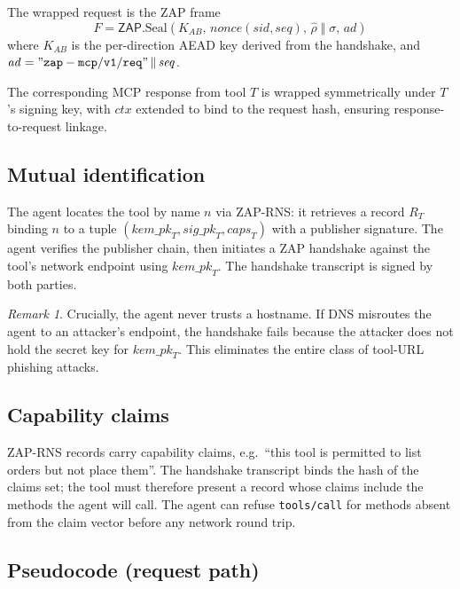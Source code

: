 \documentclass[11pt,a4paper]{article}
\theoremstyle{definition}
\theoremstyle{remark}
\newtheorem{remark}[theorem]{Remark}
\newcommand{\zap}{\textsf{ZAP}\xspace}
\newcommand{\mcp}{\textsf{MCP}\xspace}
\newcommand{\rns}{\textsf{ZAP-RNS}\xspace}
\begin{document}
The wrapped request is the \zap{} frame
\[
F = \zap.\mathrm{Seal}(K_{AB},\, \mathit{nonce}(\mathit{sid},\mathit{seq}),\,
\hat{\rho}\;\Vert\;\sigma,\, \mathit{ad})
\]
where $K_{AB}$ is the per-direction AEAD key derived from the handshake,
and $\mathit{ad} = \mathtt{"zap-mcp/v1/req"} \,\Vert\, \mathit{seq}$.

The corresponding \mcp{} response from tool $T$ is wrapped symmetrically
under $T$'s signing key, with $\mathit{ctx}$ extended to bind to the
request hash, ensuring response-to-request linkage.

\subsection{Mutual identification}

The agent locates the tool by name $n$ via \rns{}: it retrieves a record
$R_T$ binding $n$ to a tuple
$(\mathit{kem\_pk}_T, \mathit{sig\_pk}_T, \mathit{caps}_T)$ with a
publisher signature. The agent verifies the publisher chain, then
initiates a \zap{} handshake against the tool's network endpoint using
$\mathit{kem\_pk}_T$. The handshake transcript is signed by both
parties.

\begin{remark}
Crucially, the agent never trusts a hostname. If DNS misroutes the
agent to an attacker's endpoint, the handshake fails because the
attacker does not hold the secret key for $\mathit{kem\_pk}_T$.
This eliminates the entire class of tool-URL phishing attacks.
\end{remark}

\subsection{Capability claims}

\rns{} records carry capability claims, e.g.\ ``this tool is permitted
to list orders but not place them''. The handshake transcript binds the
hash of the claims set; the tool must therefore present a record whose
claims include the methods the agent will call. The agent can refuse
\texttt{tools/call} for methods absent from the claim vector before any
network round trip.

\subsection{Pseudocode (request path)}
\end{document}
